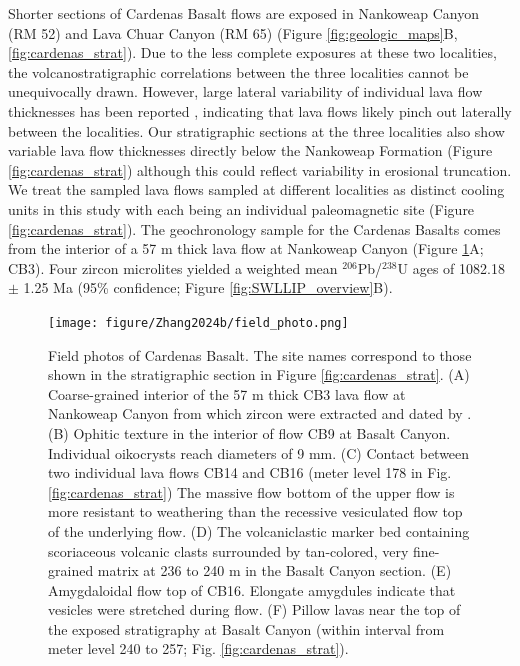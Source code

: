 Shorter sections of Cardenas Basalt flows are exposed in Nankoweap Canyon (RM 52) and Lava Chuar Canyon (RM 65) (Figure \ref{fig:geologic_maps}B, \ref{fig:cardenas_strat}). Due to the less complete exposures at these two localities, the volcanostratigraphic correlations between the three localities cannot be unequivocally drawn. However, large lateral variability of individual lava flow thicknesses has been reported \citep{Lucchitta1983a}, indicating that lava flows likely pinch out laterally between the localities. Our stratigraphic sections at the three localities also show variable lava flow thicknesses directly below the Nankoweap Formation (Figure \ref{fig:cardenas_strat}) although this could reflect variability in erosional truncation. We treat the sampled lava flows sampled at different localities as distinct cooling units in this study with each being an individual paleomagnetic site (Figure \ref{fig:cardenas_strat}). The \cite{Mohr2024a} geochronology sample for the Cardenas Basalts comes from the interior of a 57 m thick lava flow at Nankoweap Canyon (Figure \ref{fig:field_photo}A; CB3). Four zircon microlites yielded a weighted mean $^{206}$Pb/$^{238}$U ages of 1082.18 $\pm$ 1.25 Ma (95\% confidence; Figure \ref{fig:SWLLIP_overview}B). 

\begin{figure}[h!]
\centering
\texttt{[image: figure/Zhang2024b/field\_photo.png]}
\caption[Field photos of Cardenas Basalt]{Field photos of Cardenas Basalt. The site names correspond to those shown in the stratigraphic section in Figure \ref{fig:cardenas_strat}. (A) Coarse-grained interior of the 57 m thick CB3 lava flow at Nankoweap Canyon from which zircon were extracted and dated by \cite{Mohr2024a}. (B) Ophitic texture in the interior of flow CB9 at Basalt Canyon. Individual oikocrysts reach diameters of 9 mm. (C) Contact between two individual lava flows CB14 and CB16 (meter level 178 in Fig. \ref{fig:cardenas_strat}) The massive flow bottom of the upper flow is more resistant to weathering than the recessive vesiculated flow top of the underlying flow. (D) The volcaniclastic marker bed containing scoriaceous volcanic clasts surrounded by tan-colored, very fine-grained matrix at 236 to 240 m in the Basalt Canyon section. (E) Amygdaloidal flow top of CB16. Elongate amygdules indicate that vesicles were stretched during flow. (F) Pillow lavas near the top of the exposed stratigraphy at Basalt Canyon (within interval from meter level 240 to 257; Fig. \ref{fig:cardenas_strat}). }
\label{fig:field_photo}
\end{figure}

